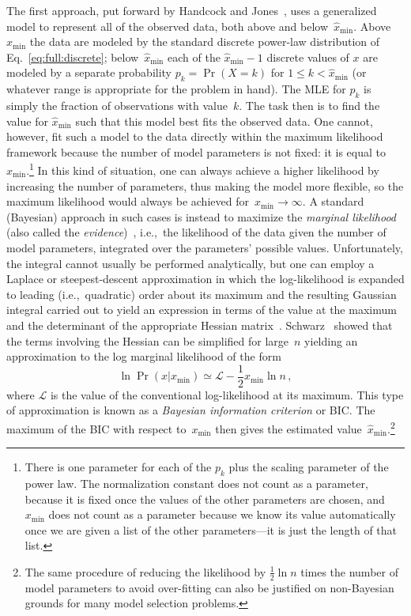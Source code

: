 \documentclass[final]{siamltex}
\newcommand{\defn}{\textit}
\newcommand{\half}{\mbox{$\frac12$}}
\newcommand{\xmin}{\ensuremath{x_{\min}}}
\newcommand{\Loglike}{\ensuremath{\mathcal{L}}}
\newcommand{\punctspace}{\,}
\begin{document}
The first approach, put forward by Handcock and
Jones~\cite{Handcock-Jones-likelihood-of-sexual-networks}, uses a
generalized model to represent all of the observed data, both above and
below~$\hat{x}_{\min}$.  Above~$\hat{x}_{\min}$ the data are modeled by the
standard discrete power-law distribution of Eq.~\eqref{eq:full:discrete};
below~$\hat{x}_{\min}$ each of the $\hat{x}_{\min}-1$ discrete values of
$x$ are modeled by a separate probability $p_k=\Pr(X=k)$ for \mbox{$1\leq
 k<\hat{x}_{\min}$} (or whatever range is appropriate for the problem in
hand).  The MLE for $p_{k}$ is simply the fraction of observations with
value~$k$.  The task then is to find the value for $\hat{x}_{\min}$ such
that this model best fits the observed data.  One cannot, however, fit such
a model to the data directly within the maximum likelihood framework
because the number of model parameters is not fixed: it is equal
to~$\xmin$.\footnote{There is one parameter for each of the $p_k$ plus the
 scaling parameter of the power law.  The normalization constant does not
 count as a parameter, because it is fixed once the values of the other
 parameters are chosen, and~$\xmin$ does not count as a parameter because
 we know its value automatically once we are given a list of the other
 parameters---it is just the length of that list.}  In this kind of
situation, one can always achieve a higher likelihood by increasing the
number of parameters, thus making the model more flexible, so the maximum
likelihood would always be achieved for~$\xmin\to\infty$.  A standard
(Bayesian) approach in such cases is instead to maximize the \defn{marginal
 likelihood} (also called the
\emph{evidence})~\cite{jeffreys:1935,mackay:2003}, i.e.,~the likelihood of
the data given the number of model parameters, integrated over the
parameters' possible values.  Unfortunately, the integral cannot usually be
performed analytically, but one can employ a Laplace or steepest-descent
approximation in which the log-likelihood is expanded to leading
(i.e.,~quadratic) order about its maximum and the resulting Gaussian
integral carried out to yield an expression in terms of the value at the
maximum and the determinant of the appropriate Hessian
matrix~\cite{Tierney-Kass-Kadane}.  Schwarz~\cite{Schwarz-BIC} showed that
the terms involving the Hessian can be simplified for large~$n$ yielding an
approximation to the log marginal likelihood of the form
\begin{equation}
\ln \Pr(x|\xmin) \simeq \Loglike - \half\xmin\ln n \punctspace ,
\end{equation}
where $\Loglike$ is the value of the conventional log-likelihood at its
maximum.  This type of approximation is known as a \defn{Bayesian
 information criterion} or BIC.  The maximum of the BIC with respect
to~$\xmin$ then gives the estimated value~$\hat{x}_{\min}$.\footnote{The
 same procedure of reducing the likelihood by $\half\ln n$ times the
 number of model parameters to avoid over-fitting can also be justified on
 non-Bayesian grounds for many model selection problems.}
\end{document}
